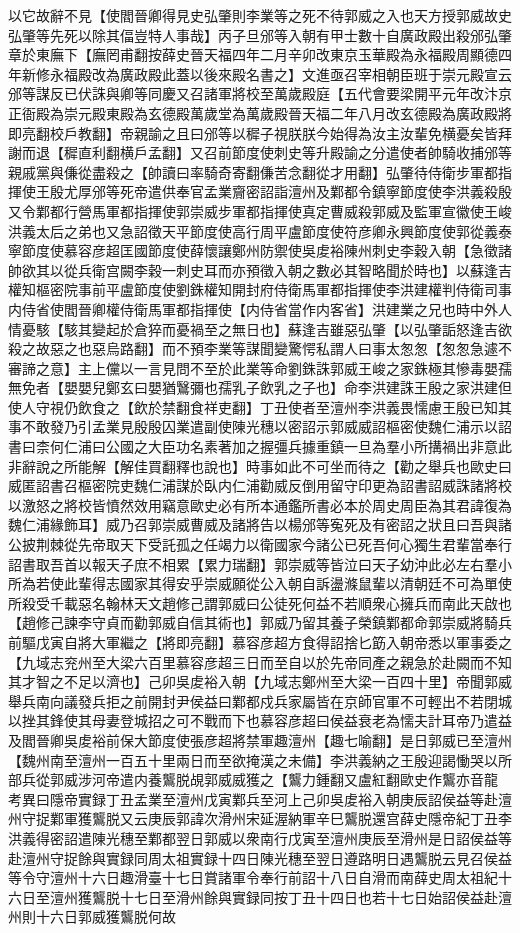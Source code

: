 以它故辭不見【使閻晉卿得見史弘肇則李業等之死不待郭威之入也天方授郭威故史弘肇等先死以除其偪豈特人事哉】丙子旦邠等入朝有甲士數十自廣政殿出殺邠弘肇章於東廡下【廡罔甫翻按薛史晉天福四年二月辛卯改東京玉華殿為永福殿周顯德四年新修永福殿改為廣政殿此蓋以後來殿名書之】文進亟召宰相朝臣班于崇元殿宣云邠等謀反已伏誅與卿等同慶又召諸軍將校至萬歲殿庭【五代會要梁開平元年改汴京正衙殿為崇元殿東殿為玄德殿萬歲堂為萬歲殿晉天福二年八月改玄德殿為廣政殿將即亮翻校戶教翻】帝親諭之且曰邠等以穉子視朕朕今始得為汝主汝輩免横憂矣皆拜謝而退【穉直利翻横戶孟翻】又召前節度使刺史等升殿諭之分遣使者帥騎收捕邠等親戚黨與傔從盡殺之【帥讀曰率騎奇寄翻傔苦念翻從才用翻】弘肇待侍衛步軍都指揮使王殷尤厚邠等死帝遣供奉官孟業齎密詔詣澶州及鄴都令鎮寧節度使李洪義殺殷又令鄴都行營馬軍都指揮使郭崇威步軍都指揮使真定曹威殺郭威及監軍宣徽使王峻洪義太后之弟也又急詔徵天平節度使高行周平盧節度使符彦卿永興節度使郭從義泰寧節度使慕容彦超匡國節度使薛懷讓鄭州防禦使吳䖍裕陳州刺史李穀入朝【急徵諸帥欲其以從兵衛宫闕李穀一刺史耳而亦預徵入朝之數必其智略聞於時也】以蘇逢吉權知樞密院事前平盧節度使劉銖權知開封府侍衛馬軍都指揮使李洪建權判侍衛司事内侍省使閻晉卿權侍衛馬軍都指揮使【内侍省當作内客省】洪建業之兄也時中外人情憂駭【駭其變起於倉猝而憂禍至之無日也】蘇逢吉雖惡弘肇【以弘肇詬怒逢吉欲殺之故惡之也惡烏路翻】而不預李業等謀聞變驚愕私謂人曰事太怱怱【怱怱急遽不審諦之意】主上儻以一言見問不至於此業等命劉銖誅郭威王峻之家銖極其慘毒嬰孺無免者【嬰嬰兒鄭玄曰嬰猶鷖彌也孺乳子飲乳之子也】命李洪建誅王殷之家洪建但使人守視仍飲食之【飲於禁翻食祥吏翻】丁丑使者至澶州李洪義畏懦慮王殷已知其事不敢發乃引孟業見殷殷囚業遣副使陳光穗以密詔示郭威威詔樞密使魏仁浦示以詔書曰柰何仁浦曰公國之大臣功名素著加之握彊兵據重鎮一旦為羣小所搆禍出非意此非辭說之所能解【解佳買翻釋也說也】時事如此不可坐而待之【勸之舉兵也歐史曰威匿詔書召樞密院吏魏仁浦謀於臥内仁浦勸威反倒用留守印更為詔書詔威誅諸將校以激怒之將校皆憤然效用竊意歐史必有所本通鑑所書必本於周史周臣為其君諱復為魏仁浦緣飾耳】威乃召郭崇威曹威及諸將告以楊邠等寃死及有密詔之狀且曰吾與諸公披荆棘從先帝取天下受託孤之任竭力以衛國家今諸公已死吾何心獨生君輩當奉行詔書取吾首以報天子庶不相累【累力瑞翻】郭崇威等皆泣曰天子幼沖此必左右羣小所為若使此輩得志國家其得安乎崇威願從公入朝自訴盪滌鼠輩以清朝廷不可為單使所殺受千載惡名翰林天文趙修己謂郭威曰公徒死何益不若順衆心擁兵而南此天啟也【趙修己諫李守貞而勸郭威自信其術也】郭威乃留其養子榮鎮鄴都命郭崇威將騎兵前驅戊寅自將大軍繼之【將即亮翻】慕容彦超方食得詔捨匕筯入朝帝悉以軍事委之【九域志兖州至大梁六百里慕容彦超三日而至自以於先帝同產之親急於赴闕而不知其才智之不足以濟也】己卯吳䖍裕入朝【九域志鄭州至大梁一百四十里】帝聞郭威舉兵南向議發兵拒之前開封尹侯益曰鄴都戍兵家屬皆在京師官軍不可輕出不若閉城以挫其鋒使其母妻登城招之可不戰而下也慕容彦超曰侯益衰老為懦夫計耳帝乃遣益及閻晉卿吳䖍裕前保大節度使張彦超將禁軍趣澶州【趣七喻翻】是日郭威已至澶州【魏州南至澶州一百五十里兩日而至欲掩漢之未備】李洪義納之王殷迎謁慟哭以所部兵從郭威涉河帝遣内養鸗脱覘郭威威獲之【鸗力鍾翻又盧紅翻歐史作鸗亦音龍　考異曰隱帝實録丁丑孟業至澶州戊寅鄴兵至河上己卯吳䖍裕入朝庚辰詔侯益等赴澶州守捉鄴軍獲鸗脱又云庚辰郭諱次滑州宋延渥納軍辛巳鸗脱還宫薛史隱帝紀丁丑李洪義得密詔遣陳光穗至鄴都翌日郭威以衆南行戊寅至澶州庚辰至滑州是日詔侯益等赴澶州守捉餘與實録同周太祖實録十四日陳光穗至翌日遵路明日遇鸗脱云見召侯益等令守澶州十六日趣滑臺十七日賞諸軍令奉行前詔十八日自滑而南薛史周太祖紀十六日至澶州獲鸗脱十七日至滑州餘與實録同按丁丑十四日也若十七日始詔侯益赴澶州則十六日郭威獲鸗脱何故